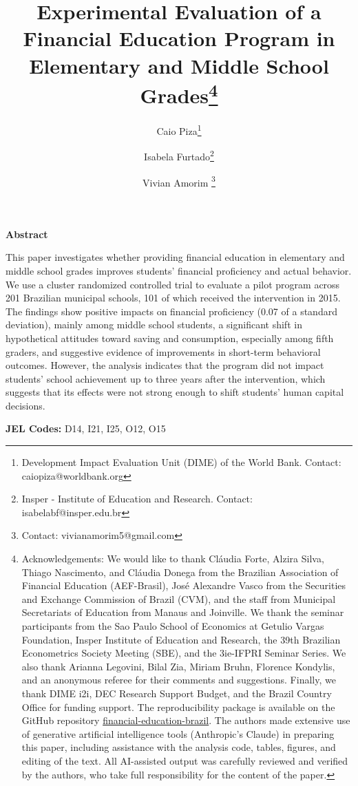 \documentclass[
	article,			%
	12pt,				%
	oneside,			%
	a4paper,			%
	]{article}
\title{Experimental Evaluation of a Financial Education Program in Elementary and Middle School Grades\thanks{\scriptsize Acknowledgements: We would like to thank Cláudia Forte, Alzira Silva, Thiago Nascimento, and Cláudia Donega from the Brazilian Association of Financial Education (AEF-Brasil), José Alexandre Vasco from the Securities and Exchange Commission of Brazil (CVM), and the staff from Municipal Secretariats of Education from Manaus and Joinville. We thank the seminar participants from the Sao Paulo School of Economics at Getulio Vargas Foundation, Insper Institute of Education and Research, the 39th Brazilian Econometrics Society Meeting (SBE), and the 3ie-IFPRI Seminar Series. We also thank Arianna Legovini, Bilal Zia, Miriam Bruhn, Florence Kondylis, and an anonymous referee for their comments and suggestions. Finally, we thank DIME i2i, DEC Research Support Budget, and the Brazil Country Office for funding support. The reproducibility package is available on the GitHub repository \href{https://github.com/vivianamorim/financial-education-brazil/tree/main/Datawork/Do\%20files}{financial-education-brazil}. The authors made extensive use of generative artificial intelligence tools (Anthropic's Claude) in preparing this paper, including assistance with the analysis code, tables, figures, and editing of the text. All AI-assisted output was carefully reviewed and verified by the authors, who take full responsibility for the content of the paper.}}
\author{Caio Piza\thanks{\scriptsize Development Impact Evaluation Unit (DIME) of the World Bank. Contact: caiopiza@worldbank.org} \and Isabela Furtado\thanks{\scriptsize Insper - Institute of Education and Research. Contact: isabelabf@insper.edu.br} \and Vivian Amorim \thanks{\scriptsize 
 Contact: vivianamorim5@gmail.com}}
\date{}
\begin{document}
\maketitle

\vspace{-50pt}
\noindent\textbf{Abstract}
\vspace{-5pt}

This paper investigates whether providing financial education in elementary and middle school grades improves students' financial proficiency and actual behavior. We use a cluster randomized controlled trial to evaluate a pilot program across 201 Brazilian municipal schools, 101 of which received the intervention in 2015. The findings show positive impacts on financial proficiency (0.07 of a standard deviation), mainly among middle school students, a significant shift in hypothetical attitudes toward saving and consumption, especially among fifth graders, and suggestive evidence of improvements in short-term behavioral outcomes. However, the analysis indicates that the program did not impact students' school achievement up to three years after the intervention, which suggests that its effects were not strong enough to shift students' human capital decisions.


\vspace{-5pt}

\noindent\textbf{JEL Codes:} D14, I21, I25, O12, O15


\thispagestyle{empty}
\pagestyle{plain}

\setcounter{footnote}{0}
\renewcommand{\thefootnote}{\arabic{footnote}}
\setcounter{page}{1}


\newpage

\newpage

\newpage

\newpage

\clearpage

\newpage
\end{document}
